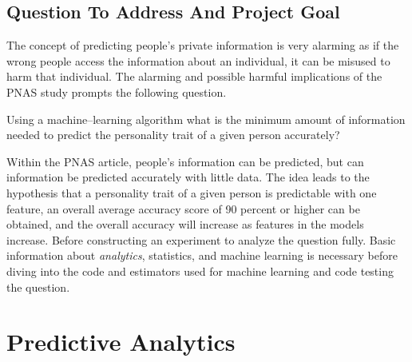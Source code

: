 \documentclass[a4paper, 12pt]{article}
\begin{document}
\subsection{Question To Address And Project Goal}
\begin{paragraph}
\indent The concept of predicting people's private information is very alarming as if the wrong people access the information about an individual, it can be misused to harm that individual. The alarming and possible harmful implications of the PNAS study prompts the following question.
\begin{theorem}
Using a machine--learning algorithm what is the minimum amount of information needed to predict the personality trait of a given person accurately?
\end{theorem}
Within the PNAS article, people's information can be predicted, but can information be predicted accurately with little data. The idea leads to the hypothesis that a personality trait of a given person is predictable with one feature, an overall average accuracy score of 90 percent or higher can be obtained, and the overall accuracy will increase as features in the models increase. Before constructing an experiment to analyze the question fully. Basic information about \textit{analytics}, statistics, and machine learning is necessary before diving into the code and estimators used for machine learning and code testing the question.
\end{paragraph}

\section{Predictive Analytics}
\end{document}
